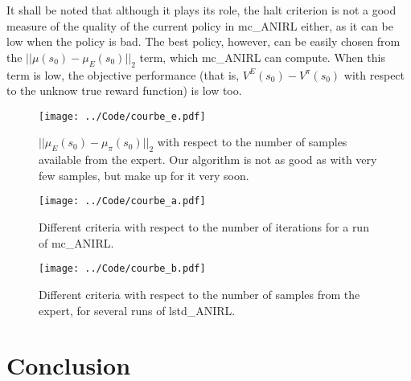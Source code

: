 \documentclass{article}
\begin{document}
It shall be noted that although it plays its role, the halt criterion is not a good measure of the quality of the current policy in mc\_ANIRL either, as it can be low when the policy is bad. The best policy, however, can be easily chosen from the $||\mu(s_0) - \mu_E(s_0)||_2$ term, which mc\_ANIRL can compute. When this term is low, the objective performance (that is, $V^E(s_0)-V^\pi(s_0)$ with respect to the unknow true reward function) is low too. 
\begin{figure}
\texttt{[image: ../Code/courbe\_e.pdf]}
\caption{$||\mu_E(s_0)-\mu_\pi(s_0)||_2$ with respect to the number of samples available from the expert. Our algorithm is not as good as \citet{abbeel2004apprenticeship} with very few samples, but make up for it very soon.}
\label{fig:E}
\end{figure}
\label{sec:perf}
\begin{figure}
\texttt{[image: ../Code/courbe\_a.pdf]}
\caption{Different criteria with respect to the number of iterations for a run of mc\_ANIRL.}
\label{fig:A}
\end{figure}
\begin{figure}
\texttt{[image: ../Code/courbe\_b.pdf]}
\caption{Different criteria with respect to the number of samples from the expert, for several runs of lstd\_ANIRL.}
\label{fig:B}
\end{figure}
\section{Conclusion}
\label{sec:conclusion}


\end{document}

